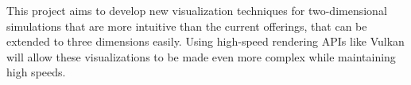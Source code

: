 This project aims to develop new visualization techniques for two-dimensional simulations that are more intuitive than the current offerings, that can be extended to three dimensions easily.
Using high-speed rendering APIs like Vulkan\cite{tool:Vulkan} will allow these visualizations to be made even more complex while maintaining high speeds.





    